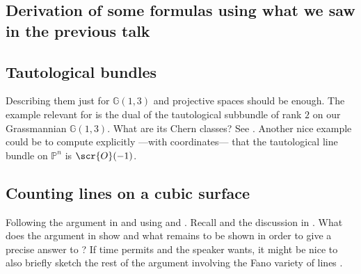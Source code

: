 \documentclass[A4paper, 12pt, british, reqno]{amsart}
\renewcommand{\O}{\scr{O}} %
\newcommand{\bbG}{\mathbb{G}}
\renewcommand{\P}{\mathbb{P}} %
\theoremstyle{plain}
\theoremstyle{definition}
\theoremstyle{remark}
\theoremstyle{plain}
\theoremstyle{definition}
\theoremstyle{remark}
\theoremstyle{plain}
\theoremstyle{definition}
\theoremstyle{remark}
\begin{document}
\subsection{Derivation of some formulas using what we saw in the previous talk \cite[\S 5.5]{eh16}}

\subsection{Tautological bundles \cite[\S 5.6]{eh16}}
Describing them just for $\bbG(1,3)$ and projective spaces should be enough.
The example relevant for  is the dual of the tautological subbundle of rank $2$ on our Grassmannian $\bbG(1,3)$.
What are its Chern classes?
See \cite[\S 5.6.2]{eh16}.
Another nice example could be to compute explicitly ---with coordinates--- that the tautological line bundle on $\P^{n}$ is $\O(-1)$.

\subsection{Counting lines on a cubic surface}
Following the argument in \cite[Thm.~5.1]{eh16} and using \cite[\S 5.6.2]{eh16} and \cite[\S 6.2.1]{eh16}.
Recall  and the discussion in \cite[\S 3.1.2]{eh16}.
What does the argument in \cite[Thm.~5.1]{eh16} show and what remains to be shown in order to give a precise answer to ?
If time permits and the speaker wants, it might be nice to also briefly sketch the rest of the argument involving the Fano variety of lines \cite[\S 6.1--6.2]{eh16}.



\vfill
\end{document}
